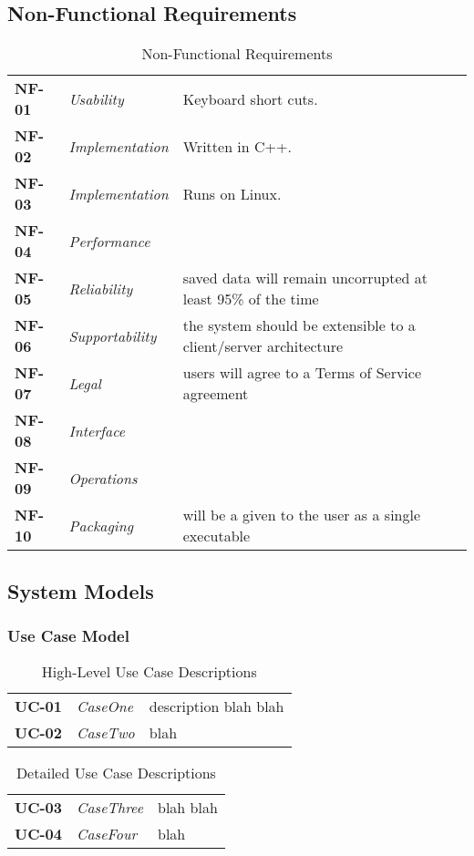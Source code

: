 \documentclass[12pt,letterpaper]{article}
\begin{document}
\subsection{Non-Functional Requirements}

\begin{table}[H]
\caption{Non-Functional Requirements}
\renewcommand{\arraystretch}{1.5}
\everyrow{\hline}
\begin{tabu} to 
NF-01 & Usability & Keyboard short cuts. \\
NF-02 & Implementation & Written in C++. \\
NF-03 & Implementation & Runs on Linux. \\
NF-04 & Performance & \\
NF-05 & Reliability & saved data will remain uncorrupted at least 95\% of the time \\
NF-06 & Supportability & the system should be extensible to a client/server architecture \\
NF-07 & Legal & users will agree to a Terms of Service agreement \\
NF-08 & Interface & \\
NF-09 & Operations & \\
NF-10 & Packaging & will be a given to the user as a single executable \\
\end{tabu}
\end{table}

\subsection{System Models}


\subsubsection{Use Case Model}

\begin{table}[H]
\caption{High-Level Use Case Descriptions}
\renewcommand{\arraystretch}{1.5}
\everyrow{\hline}
\begin{tabu} to 
UC-01 & CaseOne & description blah blah \\
UC-02 & CaseTwo & blah \\
\end{tabu}
\end{table}

\begin{table}[H]
\caption{Detailed Use Case Descriptions}
\renewcommand{\arraystretch}{1.5}
\everyrow{\hline}
\begin{tabu} to 
UC-03 & CaseThree & blah blah \\
UC-04 & CaseFour & blah \\
\end{tabu}
\end{table}
\end{document}
